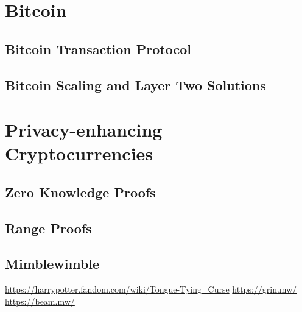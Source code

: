 \section{Bitcoin}\label{secBitcoin}

\subsection{Bitcoin Transaction Protocol}\label{secBitcoinTx}

\subsection{Bitcoin Scaling and Layer Two Solutions}\label{secBitcoinScaling}


\section{Privacy-enhancing Cryptocurrencies}\label{secPrivacy}

\subsection{Zero Knowledge Proofs}\label{secZero}

\subsection{Range Proofs}\label{secRange}

\subsection{Mimblewimble}\label{secMimble}

\urldef\urlharrypotter\url{https://harrypotter.fandom.com/wiki/Tongue-Tying_Curse}
\urldef\urlgrin\url{https://grin.mw/}
\urldef\urlbeam\url{https://beam.mw/}

